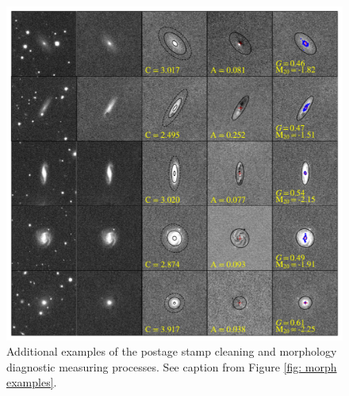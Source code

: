 \begin{figure}
\includegraphics[width=\textwidth]{Figures/measure_morph_bin3_corrected.pdf}
\caption[Examples of image cleaning and morphology diagnostic measurements]{Additional examples of the postage stamp cleaning and morphology diagnostic measuring processes. See caption from Figure \ref{fig: morph examples}.}
\label{fig: morph examples 2}
\end{figure}

